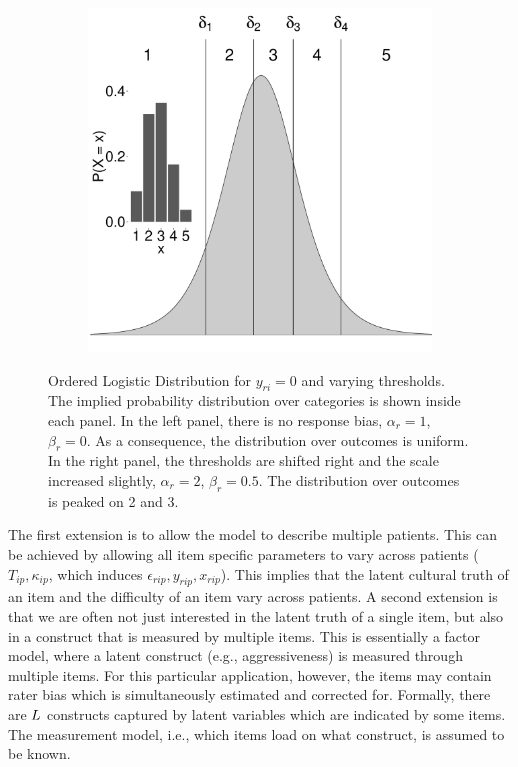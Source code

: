 \documentclass{article}
\newcommand{\Irater}{r}
\newcommand{\Iitem}{i}
\newcommand{\Ipatient}{p}
\newcommand{\Ilatent}{l}
\newcommand{\Tlatent}{\expandafter\MakeUppercase\expandafter{\Ilatent}}
\begin{document}
\begin{figure}[!ht]
\begin{subfigure}{.5\textwidth}
		\includegraphics[width=.98\textwidth]{figures/orderedLogisticBiased.pdf}
	\end{subfigure}
	\caption{Ordered Logistic Distribution for $y_{\Irater\Iitem} = 0$ and varying thresholds. The implied probability distribution over categories is shown inside each panel. In the left panel, there is no response bias, $\alpha_\Irater = 1$, $\beta_\Irater = 0$. As a consequence, the distribution over outcomes is uniform. In the right panel, the thresholds are shifted right and the scale increased slightly, $\alpha_\Irater = 2$, $\beta_\Irater = 0.5$. The distribution over outcomes is peaked on 2 and 3.}
	\label{fig:orderedLogistic}
\end{figure}

The first extension is to allow the model to describe multiple patients. This can be achieved by allowing all item specific parameters to vary across patients ($T_{\Iitem\Ipatient}, \kappa_{\Iitem\Ipatient}$, which induces $\epsilon_{\Irater\Iitem\Ipatient}, y_{\Irater\Iitem\Ipatient}, x_{\Irater\Iitem\Ipatient}$). This implies that the latent cultural truth of an item and the difficulty of an item vary across patients. A second extension is that we are often not just interested in the latent truth of a single item, but also in a construct that is measured by multiple items. This is essentially a factor model, where a latent construct (e.g., aggressiveness) is measured through multiple items. For this particular application, however, the items may contain rater bias which is simultaneously estimated and corrected for. Formally, there are $\Tlatent$ constructs captured by latent variables which are indicated by some items. The measurement model, i.e., which items load on what construct, is assumed to be known. 
\end{document}
